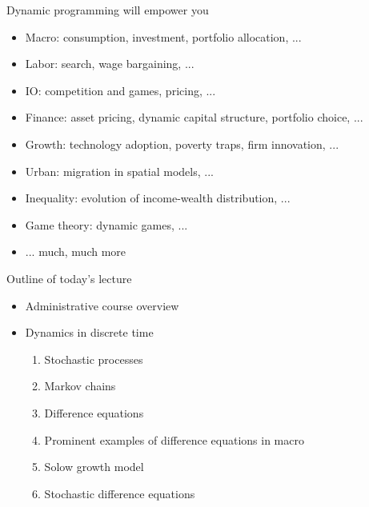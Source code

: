 \documentclass[10pt]{beamer}
\begin{document}
\begin{frame}{Dynamic programming will empower you}
\begin{itemize}
\item Macro: consumption, investment, portfolio allocation, ... 

\item Labor: search, wage bargaining, ... 

\item IO: competition and games, pricing, ...

\item Finance: asset pricing, dynamic capital structure, portfolio choice, ... 

\item Growth: technology adoption, poverty traps, firm innovation, ... 

\item Urban: migration in spatial models, ... 

\item Inequality: evolution of income-wealth distribution, ... 

\item Game theory: dynamic games, ... 

\item ... much, much more 

\end{itemize}
\end{frame}

\begin{frame}{Outline of today's lecture}
\addtocounter{framenumber}{-1}

\begin{itemize}
\item Administrative course overview

\item Dynamics in discrete time
\begin{enumerate}
	\item Stochastic processes
	\item Markov chains
	\item Difference equations
	\item Prominent examples of difference equations in macro
	\item Solow growth model
	\item Stochastic difference equations
\end{enumerate}
\end{itemize}
\end{frame}
\end{document}
